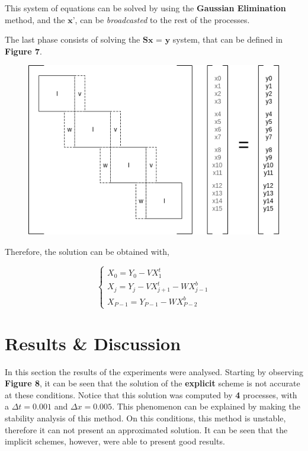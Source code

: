 \documentclass[12pt]{article}
\begin{document}
\par This system of equations can be solved by using the \textbf{Gaussian Elimination} method, and the $\textbf{x'}$, can be \textit{broadcasted} to the rest of the processes. 
\par The last phase consists of solving the $\textbf{Sx = y}$ system, that can be defined in  \textbf{Figure 7}.

\begin{figure}[!htb]
  \centering
  \includegraphics[width=.55\linewidth]{Sxy.png}
\end{figure}

\par Therefore, the solution can be obtained with\cite{spike},

\[
\left\{ 
\begin{array}{c}
X_0 = Y_0 - V X_1^t \\ 
X_{j} = Y_{j} - V X_{j + 1}^t - W X_{j - 1}^b \\ 
X_{P - 1} = Y_{P - 1} - W X_{P - 2}^b
\end{array}
\right. 
\]

\section*{Results \& Discussion}

\par In this section the results of the experiments were analysed. Starting by observing \textbf{Figure 8}, it can be seen that the solution of the \textbf{explicit} scheme is not accurate at these conditions. Notice that this solution was computed by \textbf{4} processes, with a $ \Delta t = 0.001 $ and $ \Delta x = 0.005$. This phenomenon can be explained by making the stability analysis of this method\cite{fraga}. On this conditions, this method is unstable, therefore it can not present an approximated solution. It can be seen that the implicit schemes, however, were able to present good results.
\end{document}
